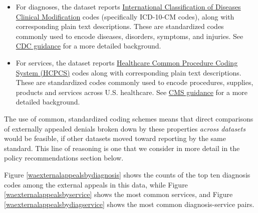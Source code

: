 \documentclass[12pt, a4paper,twoside]{report}
\theoremstyle{plain} %
\theoremstyle{definition} %
\theoremstyle{remark} %
\numberwithin{equation}{chapter}
\begin{document}
		\begin{itemize}
			\item For diagnoses, the dataset reports \href{https://en.wikipedia.org/wiki/ICD-10-CM}{International Classification of Diseases Clinical Modification} codes (specifically ICD-10-CM codes), along with corresponding plain text descriptions. These are standardized codes commonly used to encode diseases, disorders, symptoms, and injuries. See \href{https://www.cdc.gov/nchs/icd/icd-10-cm.htm}{CDC guidance} for a more detailed background.
			
			\item For services, the dataset reports \href{https://en.wikipedia.org/wiki/Healthcare_Common_Procedure_Coding_System}{Healthcare Common Procedure Coding System (HCPCS)} codes along with corresponding plain text descriptions. These are standardized codes commonly used to encode procedures, supplies, products and services across U.S. healthcare. See \href{https://www.cms.gov/medicare/fraud-and-abuse/physicianselfreferral/list_of_codes}{CMS guidance} for a more detailed background.
		\end{itemize}
	
		The use of common, standardized coding schemes means that direct comparisons of externally appealed denials broken down by these properties \emph{across datasets} would be feasible, if other datasets moved toward reporting by the same standard. This line of reasoning is one that we consider in more detail in the policy recommendations section below.
		
		Figure \ref{waexternalappealsbydiagnosis} shows the counts of the top ten diagnosis codes among the external appeals in this data, while Figure \ref{waexternalappealsbyservice} shows the most common services, and Figure \ref{waexternalappealsbydiagservice} shows the most common diagnosis-service pairs.
		
\end{document}
